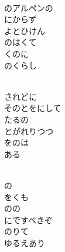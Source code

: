 \documentclass[10pt,b5j]{tarticle} %
\begin{document}
\vspace{1.5em} %
\newcommand{\linespace}{0.5em} %
\newcommand{\blocksize}{0.5\hsize} %
\newcommand{\itemmargin}{3em} %
\begin{enumerate} %
    \setlength{\itemindent}{\itemmargin} %
    \begin{minipage}[c]{\blocksize}
    
        \vspace{\linespace}
        \item~\\
        のアルペンの\\
        にからず\\
        よとひけん\\
        のはくて\\
        くのに\\
        のくらし
        
    \end{minipage}
    \begin{minipage}[c]{\blocksize}
        
        \vspace{\linespace}
        \item~\\
        されどに\\
        そのとをにして\\
        たるの\\
        とがれりつつ\\
        をのは\\
        ある
        
    \end{minipage}
    \begin{minipage}[c]{\blocksize}
        
        \vspace{\linespace}
        \item~\\
        の\\
        をくも\\
        のの\\
        にですべきぞ\\
        のりて\\
        ゆるえあり
        

\end{minipage}
\end{enumerate}
\end{document}
